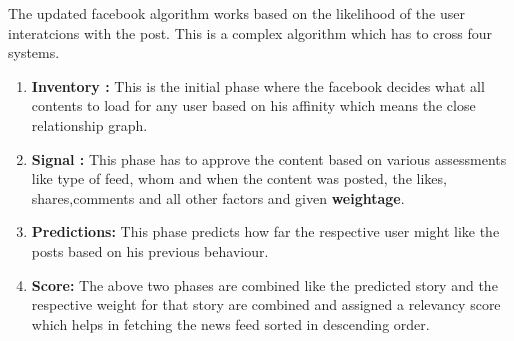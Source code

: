The updated facebook algorithm works based on the likelihood of the user interatcions with the post. This is a complex algorithm which has to cross four systems.
\begin{enumerate}
    \item \textbf{Inventory :} This is the initial phase where the facebook decides what all contents to load for any user based on his affinity which means the close relationship graph.
    \item \textbf{ Signal :} This phase has to approve the content based on various assessments like type of feed, whom and when the content was posted, the likes, shares,comments and all other factors and given \textbf{weightage}.
    \item \textbf{Predictions:} This phase predicts how far the respective user might like the posts based on his previous behaviour\cite{WebFX2021}.
    \item \textbf{Score:} The above two phases are combined like the predicted story and the respective weight for that story are combined and assigned a relevancy score which helps in fetching the news feed sorted in descending order.
\end{enumerate}

